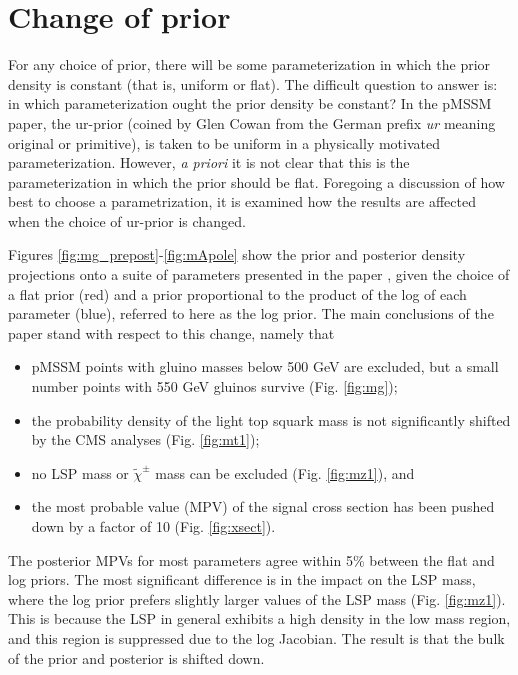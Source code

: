 \section{Change of prior}
For any choice of prior, there will be some parameterization in which the prior density is constant (that is, uniform or flat). The difficult question to answer is: in which parameterization ought the prior density be constant? In the pMSSM paper, the ur-prior (coined by Glen Cowan from the German prefix {\it ur} meaning original or primitive), is taken to be uniform in a physically motivated parameterization. However, \emph{a priori} it is not clear that this
is the parameterization in which the prior should be flat.  
Foregoing a discussion of how best to choose a parametrization,  it is examined how the results are affected when the choice of ur-prior is changed.

Figures \ref{fig:mg_prepost}-\ref{fig:mApole} show the prior and posterior density projections onto a suite of parameters presented in the paper \cite{Khachatryan:2016nvf}, given the choice of a flat prior (red) and a prior proportional to the product of the log of each parameter (blue), referred to here as the log prior. The main conclusions of the paper stand with respect to this change, namely that
\begin{itemize}
\item pMSSM points with gluino masses below 500 GeV are excluded, but a small number points with 550 GeV gluinos survive (Fig. \ref{fig:mg});
\item the probability density of the light top squark mass is not significantly shifted by the CMS analyses (Fig. \ref{fig:mt1});
\item no LSP mass or $\tilde{\chi}^{\pm}$ mass can be excluded (Fig. \ref{fig:mz1}), and
\item the most probable value (MPV) of the signal cross section has been pushed down by a factor of 10 (Fig. \ref{fig:xsect}).
\end{itemize}
The posterior MPVs for most parameters agree within 5\% between the flat and log priors. The most significant difference is in the impact on the LSP mass, where the log prior prefers slightly larger values of the LSP mass (Fig. \ref{fig:mz1}). This is because the LSP in general exhibits a high density in the low mass region, and this region is suppressed due to the log Jacobian.  The result is that the bulk of the prior and posterior is shifted down.


